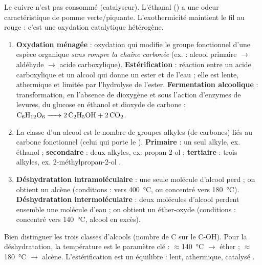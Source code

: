 \documentclass[11pt]{article}
\newcommand{\cle}[1]{{\popxbold\color{popdark}#1}}
\begin{document}
\begin{attention}
Le cuivre n'est pas consommé (catalyseur). L'éthanal () a une odeur caractéristique de pomme verte/piquante. L'exothermicité maintient le fil au rouge : c'est une oxydation catalytique hétérogène.
\end{attention}

\begin{corrige}
\begin{enumerate}
  \item \textbf{Oxydation ménagée} : oxydation qui modifie le groupe fonctionnel d'une espèce organique \emph{sans rompre la chaîne carbonée} (ex. : alcool primaire $\rightarrow$ aldéhyde $\rightarrow$ acide carboxylique). \textbf{Estérification} : réaction entre un acide carboxylique et un alcool qui donne un \cle{ester} et de l'eau ; elle est lente, athermique et limitée par l'hydrolyse de l'ester. \textbf{Fermentation alcoolique} : transformation, en l'absence de dioxygène et sous l'action d'enzymes de levures, du glucose en éthanol et dioxyde de carbone : $\ce{C6H12O6 -> 2 C2H5OH + 2 CO2}$.
  \item La \cle{classe} d'un alcool est le nombre de groupes alkyles (de carbones) liés au carbone fonctionnel (celui qui porte le ). \textbf{Primaire} : un seul alkyle, ex. éthanol  ; \textbf{secondaire} : deux alkyles, ex. propan-2-ol  ; \textbf{tertiaire} : trois alkyles, ex. 2-méthylpropan-2-ol .
  \item \textbf{Déshydratation intramoléculaire} : une seule molécule d'alcool perd  ; on obtient un \cle{alcène} (conditions :  vers \SI{400}{\celsius}, ou  concentré vers \SI{180}{\celsius}). \textbf{Déshydratation intermoléculaire} : deux molécules d'alcool perdent ensemble une molécule d'eau ; on obtient un \cle{éther-oxyde} (conditions :  concentré vers \SI{140}{\celsius}, alcool en excès).
\end{enumerate}
\end{corrige}

\begin{attention}
Bien distinguer les trois classes d'alcools (nombre de C sur le C-OH). Pour la déshydratation, la température est le paramètre clé : $\approx$\SI{140}{\celsius} $\rightarrow$ éther ; $\approx$\SI{180}{\celsius} $\rightarrow$ alcène. L'estérification est un équilibre : lent, athermique, catalysé .
\end{attention}
\end{document}
